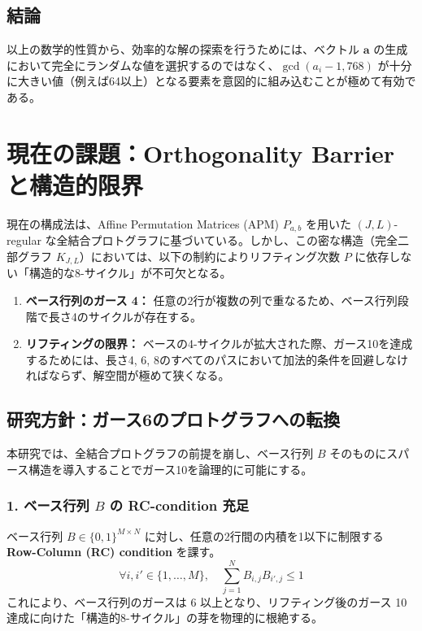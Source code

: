 \documentclass[a4paper,11pt,dvipdfmx]{jsarticle}
\theoremstyle{definition}
\begin{document}
\subsection{結論}
以上の数学的性質から、効率的な解の探索を行うためには、ベクトル $\mathbf{a}$ の生成において完全にランダムな値を選択するのではなく、$\gcd(a_i - 1, 768)$ が十分に大きい値（例えば64以上）となる要素を意図的に組み込むことが極めて有効である。

\section{現在の課題：Orthogonality Barrier と構造的限界}
現在の構成法は、Affine Permutation Matrices (APM) $P_{a,b}$ を用いた $(J, L)$-regular な全結合プロトグラフに基づいている。しかし、この密な構造（完全二部グラフ $K_{J,L}$）においては、以下の制約によりリフティング次数 $P$ に依存しない「構造的な8-サイクル」が不可欠となる。
\begin{enumerate}
    \item \textbf{ベース行列のガース 4：} 任意の2行が複数の列で重なるため、ベース行列段階で長さ4のサイクルが存在する。
    \item \textbf{リフティングの限界：} ベースの4-サイクルが拡大された際、ガース10を達成するためには、長さ4, 6, 8のすべてのパスにおいて加法的条件を回避しなければならず、解空間が極めて狭くなる。
\end{enumerate}

\subsection{研究方針：ガース6のプロトグラフへの転換}
本研究では、全結合プロトグラフの前提を崩し、ベース行列 $B$ そのものにスパース構造を導入することでガース10を論理的に可能にする。

\subsubsection{1. ベース行列 $B$ の RC-condition 充足}
ベース行列 $B \in \{0, 1\}^{M \times N}$ に対し、任意の2行間の内積を1以下に制限する \textbf{Row-Column (RC) condition} を課す。
\begin{equation}
    \forall i, i' \in \{1, \dots, M\}, \quad \sum_{j=1}^{N} B_{i,j} B_{i',j} \le 1
\end{equation}
これにより、ベース行列のガースは 6 以上となり、リフティング後のガース 10 達成に向けた「構造的8-サイクル」の芽を物理的に根絶する。

\end{document}
